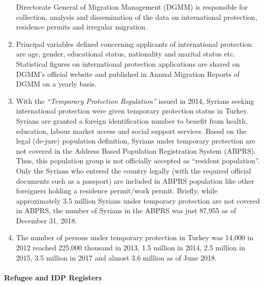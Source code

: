 \documentclass[
]{article}
\begin{document}
\begin{enumerate}
  Directorate General of Migration Management (DGMM) is responsible
  for collection, analysis and dissemination of the data on
  international protection, residence permits and irregular migration.
\item
  Principal variables defined concerning applicants of international
  protection are age, gender, educational status, nationality and
  marital status etc. Statistical figures on international protection
  applications are shared on DGMM's official website and published in
  Annual Migration Reports of DGMM on a yearly basis.
\item
  With the \emph{``Temporary Protection Regulation''} issued in 2014,
  Syrians seeking international protection were given temporary
  protection status in Turkey. Syrians are granted a foreign
  identification number to benefit from health, education, labour
  market access and social support services. Based on the legal
  (de-jure) population definition, Syrians under temporary protection
  are not covered in the Address Based Population Registration System
  (ABPRS). Thus, this population group is not officially accepted as
  ``resident population''. Only the Syrians who entered the country
  legally (with the required official documents such as a passport)
  are included in ABPRS population like other foreigners holding a
  residence permit/work permit. Briefly, while approximately 3.5
  million Syrians under temporary protection are not covered in ABPRS,
  the number of Syrians in the ABPRS was just 87,955 as of December
  31, 2018.
\item
  The number of persons under temporary protection in Turkey was
  14,000 in 2012 reached 225,000 thousand in 2013, 1.5 million in
  2014, 2.5 million in 2015, 3.5 million in 2017 and almost 3.6
  million as of June 2018.
\end{enumerate}

\hypertarget{c.2.-refugee-and-idp-registers}{%
\paragraph{Refugee and IDP Registers}\label{c.2.-refugee-and-idp-registers}}
\end{document}
